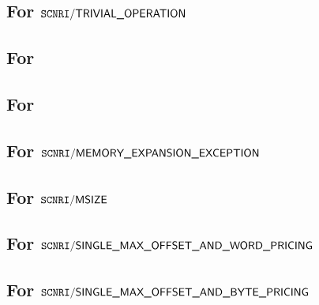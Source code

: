 
\subsection{For $\texttt{SCNRI}\textsf{/}{\textsf{TRIVIAL\_OPERATION}}$}                                                                  
                                                
\subsection{For \locMxpScenarioNonTrivialOperation}                                                              
\subsection{For \locMxpScenarioNonTrivialNonMxpx}                                                                
                                                                    
\subsection{For $\texttt{SCNRI}\textsf{/}{\textsf{MEMORY\_EXPANSION\_EXCEPTION}}$}                                                          
\subsection{For $\texttt{SCNRI}\textsf{/}{\textsf{MSIZE}}$}                                                                             
                                                
                                                                    
\subsection{For $\texttt{SCNRI}\textsf{/}{\textsf{SINGLE\_MAX\_OFFSET\_AND\_WORD\_PRICING}}$}                                                      
\subsection{For $\texttt{SCNRI}\textsf{/}{\textsf{SINGLE\_MAX\_OFFSET\_AND\_BYTE\_PRICING}}$}                                                                  
